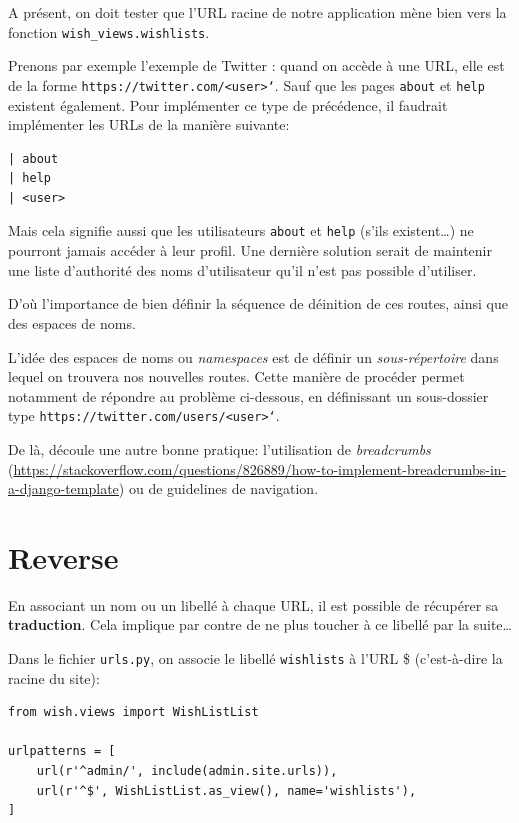 \documentclass[11pt]{amsbook}
\begin{document}
A présent, on doit tester que l’URL racine de notre application mène bien vers la fonction \texttt{wish\_views.wishlists}.


Prenons par exemple l’exemple de Twitter : quand on accède à une URL, elle est de la forme \texttt{https://twitter.com/<user>`}. Sauf que les pages \texttt{about} et \texttt{help} existent également. Pour implémenter ce type de précédence, il faudrait implémenter les URLs de la manière suivante:


\begin{verbatim}
| about
| help
| <user>
\end{verbatim}

Mais cela signifie aussi que les utilisateurs \texttt{about} et \texttt{help} (s’ils existent…​) ne pourront jamais accéder à leur profil. Une dernière solution serait de maintenir une liste d’authorité des noms d’utilisateur qu’il n’est pas possible d’utiliser.


D’où l’importance de bien définir la séquence de déinition de ces routes, ainsi que des espaces de noms.


L’idée des espaces de noms ou \emph{namespaces} est de définir un \emph{sous-répertoire} dans lequel on trouvera nos nouvelles routes. Cette manière de procéder permet notamment de répondre au problème ci-dessous, en définissant un sous-dossier type \texttt{https://twitter.com/users/<user>`}.


De là, découle une autre bonne pratique: l’utilisation de \emph{breadcrumbs} (\href{https://stackoverflow.com/questions/826889/how-to-implement-breadcrumbs-in-a-django-template}{https://stackoverflow.com/questions/826889/how-to-implement-breadcrumbs-in-a-django-template}) ou de guidelines de navigation.


\hypertarget{x-reverse}{\section{Reverse}}
En associant un nom ou un libellé à chaque URL, il est possible de récupérer sa \textbf{traduction}. Cela implique par contre de ne plus toucher à ce libellé par la suite…​


Dans le fichier \texttt{urls.py}, on associe le libellé \texttt{wishlists} à l’URL \$ (c’est-à-dire la racine du site):


\begin{verbatim}
from wish.views import WishListList

urlpatterns = [
    url(r'^admin/', include(admin.site.urls)),
    url(r'^$', WishListList.as_view(), name='wishlists'),
]
\end{verbatim}
\end{document}
